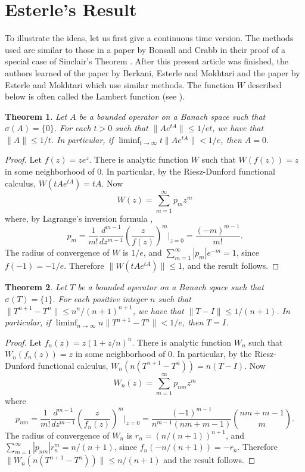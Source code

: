 \documentclass[12pt]{amsart}
\newtheorem{thm}{Theorem}[section]
\newcommand{\modo}[1]{{\left|#1\right|}}
\newcommand{\snormo}[1]{{\mathopen\|#1\mathclose\|}}
\begin{document}
\section{Esterle's Result}

To illustrate the ideas, let us first give a
continuous time version.
The methods used are similar to those in a paper by
Bonsall and Crabb \cite{bonsall-crabb} in their proof of a special case of
Sinclair's Theorem \cite{sinclair}.
After this present article was finished, the authors learned of
the paper by Berkani, Esterle and Mokhtari \cite{berkani-esterle-mokhtari} and
the paper by Esterle and Mokhtari
\cite{esterle-mokhtari}
which use similar methods.
The function $W$ described below is often called
the Lambert function (see \cite{corless et al}).

\begin{thm}
\label{esterle continuous}
Let $A$ be a bounded operator on a Banach space such that
$\sigma(A) = \{0\}$.  For each $t>0$ such that
$\snormo{A e^{tA}} \le 1/et$, we have that $\snormo{A} \le 1/t$.
In particular, if
$\liminf_{t\to\infty} t \snormo{Ae^{tA}} < 1/e$,
then $A = 0$.
\end{thm}

\begin{proof}
Let $f(z) = z e^z$.
There is analytic function $W$ such that
$W(f(z)) = z$ in some neighborhood of $0$.  In particular,
by the Riesz-Dunford functional calculus,
$W(tA e^{tA}) = tA$.
Now
$$ W(z) = \sum_{m=1}^\infty p_{m} z^m $$
where, by Lagrange's inversion formula \cite[Ch.~5, Ex.~33]{asmar},
$$ p_{m} = \frac1{m!}\frac{d^{m-1}}{dz^{m-1}} \left(\frac z{f(z)}\right)^m
            \Bigg |_{z=0}
          = \frac{(-m)^{m-1}}{m!} .$$
The radius of convergence of $W$ is $1/e$, and
$ \sum_{m=1}^\infty \modo{p_{m}} e^{-m} = 1 $,
since $f(-1) = -1/e$.
Therefore
$\snormo{W(tA e^{tA})} \le 1$, and the result follows.
\end{proof}

\begin{thm}
\label{esterle}
Let $T$ be a bounded operator on a Banach space such that
$\sigma(T) = \{1\}$.  For each positive integer $n$ such that
$\snormo{T^{n+1}-T^n} \le n^n/(n+1)^{n+1}$, we have that
$\snormo{T-I} \le 1/(n+1)$.  In particular, if
$\liminf_{n\to\infty} n \snormo{T^{n+1}-T^n} < 1/e$,
then $T = I$.
\end{thm}

\begin{proof}
Let $f_n(z) = z(1+z/n)^n$.
There is analytic function $W_n$ such that
$W_n(f_n(z)) = z$ in some neighborhood of $0$.  In particular,
by the Riesz-Dunford functional calculus,
$W_n(n(T^{n+1}-T^n)) = n(T-I)$.
Now
$$ W_n(z) = \sum_{m=1}^\infty p_{nm} z^m $$
where
$$ p_{nm} = \frac1{m!}\frac{d^{m-1}}{dz^{m-1}} \left(\frac z{f_n(z)}\right)^m
            \Bigg |_{z=0}
          = \frac{(-1)^{m-1}}{n^{m-1} (nm+m-1)}
            \binom{nm+m-1}m .$$
The radius of convergence of $W_n$ is $r_n = (n/(n+1))^{n+1}$, and
$\sum_{m=1}^\infty \modo{p_{nm}} r_n^m = n/(n+1)$,
since $f_n(-n/(n+1)) = -r_n$.
Therefore
$\snormo{W_n(n(T^{n+1}-T^n))} \le n/(n+1)$
and the result follows.
\end{proof}
\end{document}
